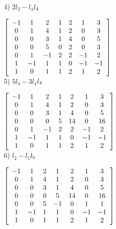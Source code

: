 \documentclass{article}
\begin{document}
4) $2l_{2} - l_{4} $\to$ l_{4}\\ 
\newline$

$\left[\begin{array}{ccccccc}
-1 &  1 &  2 &  1 &  2 &  1 &  3 \\
0  &  1 &  4 &  1 &  2 &  0 &  3 \\
0  &  0 &  3 &  1 &  4 &  0 &  5 \\ 
0  &  0 &  5 &  0 &  2 &  0 &  3 \\ 
0  &  1 & -1 &  2 &  2 & -1 &  2 \\ 
1  & -1 &  1 &  1 &  0 & -1 & -1 \\ 
1  &  0 &  1 &  1 &  2 &  1 &  2 \\ 
 \end{array}\right]\\
  \newline$\\

5) $5l_{3} - 3l_{4} $\to$ l_{4}\\ 
\newline$

$\left[\begin{array}{ccccccc}
-1 &  1 &  2 &  1 &  2 &  1 &  3 \\
0  &  1 &  4 &  1 &  2 &  0 &  3 \\
0  &  0 &  3 &  1 &  4 &  0 &  5 \\ 
0  &  0 &  0 &  5 &  14&  0 &  16\\ 
0  &  1 & -1 &  2 &  2 & -1 &  2 \\ 
1  & -1 &  1 &  1 &  0 & -1 & -1 \\ 
1  &  0 &  1 &  1 &  2 &  1 &  2 \\ 
 \end{array}\right]\\
  \newline$\\

6) $l_{2} - l_{5} $\to$ l_{5}\\ 
\newline$

$\left[\begin{array}{ccccccc}
-1 &  1 &  2 &  1 &  2 &  1 &  3 \\
0  &  1 &  4 &  1 &  2 &  0 &  3 \\
0  &  0 &  3 &  1 &  4 &  0 &  5 \\ 
0  &  0 &  0 &  5 &  14&  0 &  16\\ 
0  &  0 &  5 & -1 &  0 &  1 &   1\\ 
1  & -1 &  1 &  1 &  0 & -1 & -1 \\ 
1  &  0 &  1 &  1 &  2 &  1 &  2 \\ 
 \end{array}\right]\\
  \newline$\\
  
\end{document}
